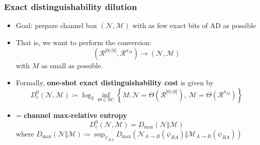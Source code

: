 \documentclass[usenames,dvipsnames,handout]{beamer}
\begin{document}
\begin{frame}
\frametitle{Exact distinguishability dilution}

\begin{itemize}

\pause
\item Goal: prepare channel box $(\mathcal{N},\mathcal{M})$ with as few exact bits of AD as possible

\pause
\item That is, we want to perform the conversion:
$$
(\mathcal{R}^{|0\rangle\!\langle 0 |}, \mathcal{R}^{\pi_M}) \rightarrow (\mathcal{N},\mathcal{M})
$$
with $M$ as small as possible.

\pause
\item Formally, {\color{MidnightBlue}\textbf{one-shot exact distinguishability cost}}  is given by
$$
D_{c}^{0}(\mathcal{N},\mathcal{M})\coloneqq 
\log_{2}\inf_{\Theta\in\text{SC}}\left\{  M:
\mathcal{N}
=\Theta(\mathcal{R}^{|0\rangle\!\langle 0 |}),\ \mathcal{M}=\Theta(\mathcal{R}^{\pi_M})\right\}
$$

\pause
\item = {\color{MidnightBlue}\textbf{channel max-relative entropy}} \cite{Cooney2016,LKDW18,GFWRSCW18}
$$
D_{c}^{0}(\mathcal{N},\mathcal{M})=D_{\max}(\mathcal{N}  \Vert\mathcal{M})
$$
where $D_{\max}(\mathcal{N}  \Vert\mathcal{M})    \coloneqq \sup_{\psi_{RA}} D_{\max}(\mathcal{N}_{A \to B} (\psi_{RA}) \Vert \mathcal{M}_{A\to B}(\psi_{RA}))$

\end{itemize}

\end{frame}
\end{document}
